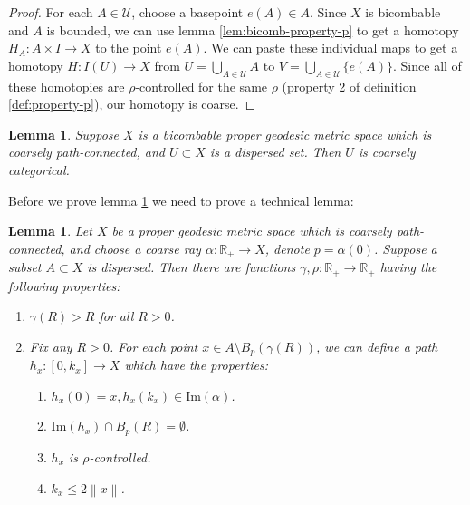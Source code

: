 \documentclass {amsart}
\newcommand {\U}        {\mathcal{U}}
\newcommand {\Rplus}    {\mathbb{R}_{+}}
\newcommand {\im}       {\text{Im}}
\newcommand {\norm} [1] {\left\| #1 \right\|}
\newtheorem   {lemma}       [theorem] {Lemma}
\theoremstyle {definition}
\begin{document}
\begin{proof}
    For each \( A \in \U \), choose a basepoint \( e(A) \in A \). Since \( X \) is
    bicombable and \( A \) is bounded, we can use lemma \ref{lem:bicomb-property-p}
    to get a homotopy \( H_A : A \times I \to X \) to the point \( e(A) \). We can
    paste these individual maps to get a homotopy \( H: I (U) \to X \) from \( U =
    \bigcup _{A \in \U} A \) to \( V = \bigcup _{A \in \U} \{ e(A) \} \). 
    Since all of these homotopies are \( \rho \)-controlled for the same \( \rho
    \) (property 2 of definition \ref{def:property-p}), our homotopy is coarse.
\end{proof}

\begin{lemma}
    \label{lem:dispersed-categorical}
    Suppose \( X \) is a bicombable proper geodesic metric space which is coarsely
    path-connected, and \( U \subset X \) is a dispersed set. Then \( U \) 
    is coarsely categorical.
\end{lemma}

Before we prove lemma \ref{lem:dispersed-categorical} we need to prove a
technical lemma:

\begin{lemma}
    \label{lem:technical}
    Let \( X \) be a proper geodesic metric space which is coarsely path-connected, 
    and choose a coarse ray \( \alpha : \Rplus \to X \), denote
    \( p = \alpha(0) \). Suppose a subset \( A \subset X \) is dispersed. Then 
    there are functions \( \gamma, \rho : \Rplus \to \Rplus \) having the
    following properties:
    \begin{enumerate}
        \item \( \gamma(R) > R \) for all \( R > 0 \).
        \item Fix any \( R > 0 \). For each point \( x \in A \setminus B _{p} (\gamma(R)) \),
              we can define a path \( h_x : [0, k_x] \to X \) which have the properties:
              \begin{enumerate}
                  \item \( h_x (0) = x, h_x(k_x) \in \im (\alpha) \).
                  \item \( \im (h_x) \cap B _{p} (R) = \emptyset \).
                  \item \( h_x \) is \( \rho \)-controlled.
                  \item \( k_x \leq 2 \norm x \).
              \end{enumerate}
    \end{enumerate}
\end{lemma}
\end{document}
